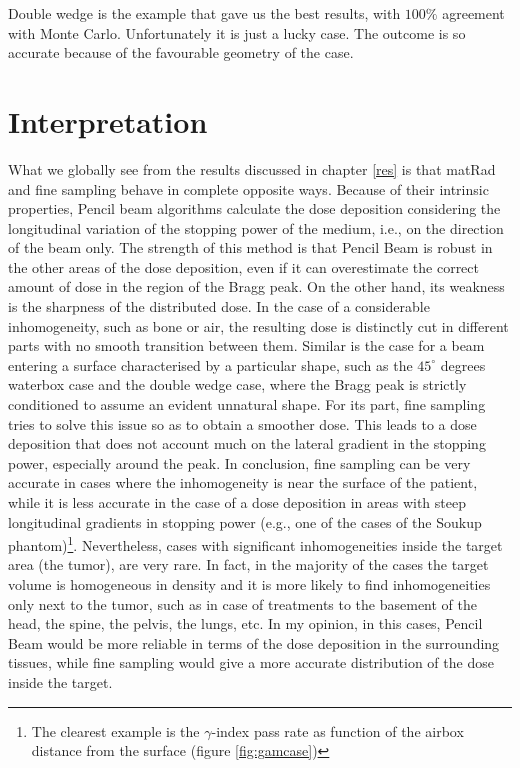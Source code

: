 \documentclass[12pt, a4paper, twoside]{book}
\begin{document}
Double wedge is the example that gave us the best results, with $100\%$ agreement with Monte Carlo. Unfortunately it is just a lucky case. The outcome is so accurate because of the favourable geometry of the case. 


\section{Interpretation}
What we globally see from the results discussed in chapter \ref{res} is that matRad and fine sampling behave in complete opposite ways. Because of their intrinsic properties, Pencil beam algorithms calculate the dose deposition considering the longitudinal variation of the stopping power of the medium, i.e., on the direction of the beam only. The strength of this method is that Pencil Beam is robust in the other areas of the dose deposition, even if it can overestimate the correct amount of dose in the region of the Bragg peak. On the other hand, its weakness is the sharpness of the distributed dose. In the case of a considerable inhomogeneity, such as bone or air, the resulting dose is distinctly cut in different parts with no smooth transition between them. Similar is the case for a beam entering a surface characterised by a particular shape, such as the $45^\circ$ degrees waterbox case and the double wedge case, where the Bragg peak is strictly conditioned to assume an evident unnatural shape.
For its part, fine sampling tries to solve this issue so as to obtain a smoother dose. This leads to a dose deposition that does not account much on the lateral gradient in the stopping power, especially around the peak.
In conclusion, fine sampling can be very accurate in cases where the inhomogeneity is near the surface of the patient, while it is less accurate in the case of a dose deposition in areas with steep longitudinal gradients in stopping power (e.g., one of the cases of the Soukup phantom)\footnote{The clearest example is the $\gamma$-index pass rate as function of the airbox distance from the surface (figure \ref{fig:gamcase})}. Nevertheless, cases with significant inhomogeneities inside the target area (the tumor), are very rare. In fact, in the majority of the cases the target volume is homogeneous in density and it is more likely to find inhomogeneities only next to the tumor, such as in case of treatments to the basement of the head, the spine, the pelvis, the lungs, etc. In my opinion, in this cases, Pencil Beam would be more reliable in terms of the dose deposition in the surrounding tissues, while fine sampling would give a more accurate distribution of the dose inside the target.
\end{document}
